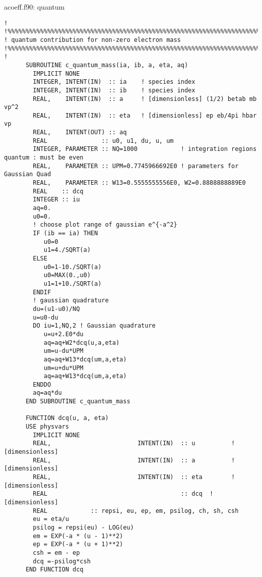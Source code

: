 \documentclass[preprint,12pt,eqsecnum,nofootinbib,amsmath,amssymb]{revtex4}
\begin{document}
{{\vskip1cm 
\noindent
acoeff.f90: quantum
{
\baselineskip 10pt
\begin{verbatim}
!
!%%%%%%%%%%%%%%%%%%%%%%%%%%%%%%%%%%%%%%%%%%%%%%%%%%%%%%%%%%%%%%%%%%%%%%%
! quantum contribution for non-zero electron mass
!%%%%%%%%%%%%%%%%%%%%%%%%%%%%%%%%%%%%%%%%%%%%%%%%%%%%%%%%%%%%%%%%%%%%%%%
!
      SUBROUTINE c_quantum_mass(ia, ib, a, eta, aq)
        IMPLICIT NONE
        INTEGER, INTENT(IN)  :: ia    ! species index
        INTEGER, INTENT(IN)  :: ib    ! species index
        REAL,    INTENT(IN)  :: a     ! [dimensionless] (1/2) betab mb vp^2
        REAL,    INTENT(IN)  :: eta   ! [dimensionless] ep eb/4pi hbar vp
        REAL,    INTENT(OUT) :: aq 
        REAL               :: u0, u1, du, u, um
        INTEGER, PARAMETER :: NQ=1000            ! integration regions quantum : must be even
        REAL,    PARAMETER :: UPM=0.7745966692E0 ! parameters for Gaussian Quad
        REAL,    PARAMETER :: W13=0.5555555556E0, W2=0.8888888889E0
        REAL    :: dcq
        INTEGER :: iu
        aq=0.
        u0=0.
        ! choose plot range of gaussian e^{-a^2}
        IF (ib == ia) THEN
           u0=0
           u1=4./SQRT(a)
        ELSE
           u0=1-10./SQRT(a)
           u0=MAX(0.,u0)  
           u1=1+10./SQRT(a)
        ENDIF
        ! gaussian quadrature
        du=(u1-u0)/NQ
        u=u0-du
        DO iu=1,NQ,2 ! Gaussian quadrature
           u=u+2.E0*du
           aq=aq+W2*dcq(u,a,eta)
           um=u-du*UPM
           aq=aq+W13*dcq(um,a,eta)
           um=u+du*UPM
           aq=aq+W13*dcq(um,a,eta)
        ENDDO
        aq=aq*du
      END SUBROUTINE c_quantum_mass

      FUNCTION dcq(u, a, eta)
      USE physvars
        IMPLICIT NONE
        REAL,                        INTENT(IN)  :: u          ! [dimensionless]
        REAL,                        INTENT(IN)  :: a          ! [dimensionless]
        REAL,                        INTENT(IN)  :: eta        ! [dimensionless]
        REAL                                     :: dcq  ! [dimensionless]
        REAL            :: repsi, eu, ep, em, psilog, ch, sh, csh
        eu = eta/u
        psilog = repsi(eu) - LOG(eu)
        em = EXP(-a * (u - 1)**2)
        ep = EXP(-a * (u + 1)**2)
        csh = em - ep
        dcq =-psilog*csh
      END FUNCTION dcq
\end{verbatim}
}






\pagebreak
\appendix



}}
\end{document}
